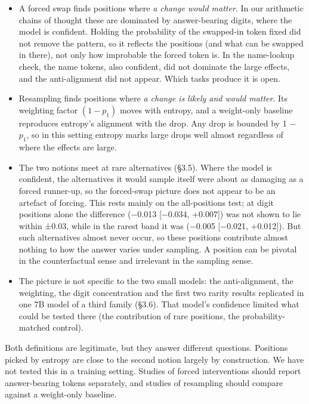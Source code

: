 \documentclass[
  10pt,
  a4paper,
]{article}
\begin{document}
\begin{itemize}
\item
  A forced swap finds positions where \emph{a change would matter}. In our arithmetic chains of thought these are dominated by answer-bearing digits, where the model is confident. Holding the
  probability of the swapped-in token fixed did not remove the pattern, so it reflects the positions (and what can be swapped in there), not only how improbable the forced token is. In the name-lookup
  check, the name tokens, also confident, did not dominate the large effects, and the anti-alignment did not appear. Which tasks produce it is open.
\item
  Resampling finds positions where \emph{a change is likely and would matter}. Its weighting factor \((1-p_1)\) moves with entropy, and a weight-only baseline reproduces entropy's alignment with the
  drop. Any drop is bounded by 1 − \(p_1\), so in this setting entropy marks large drops well almost regardless of where the effects are large.
\item
  The two notions meet at rare alternatives (§3.5). Where the model is confident, the alternatives it would sample itself were about as damaging as a forced runner-up, so the forced-swap picture does
  not appear to be an artefact of forcing. This rests mainly on the all-positions test; at digit positions alone the difference (−0.013 {[}−0.034, +0.007{]}) was not shown to lie within ±0.03, while
  in the rarest band it was (−0.005 {[}−0.021, +0.012{]}). But such alternatives almost never occur, so these positions contribute almost nothing to how the answer varies under sampling. A position
  can be pivotal in the counterfactual sense and irrelevant in the sampling sense.
\item
  The picture is not specific to the two small models: the anti-alignment, the weighting, the digit concentration and the first two rarity results replicated in one 7B model of a third family (§3.6).
  That model's confidence limited what could be tested there (the contribution of rare positions, the probability-matched control).
\end{itemize}

Both definitions are legitimate, but they answer different questions. Positions picked by entropy are close to the second notion largely by construction. We have not tested this in a training setting.
Studies of forced interventions should report answer-bearing tokens separately, and studies of resampling should compare against a weight-only baseline.
\end{document}
